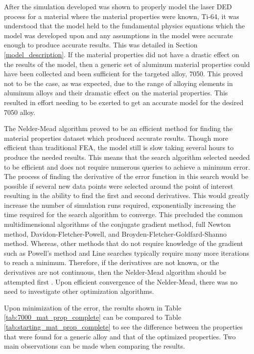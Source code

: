 \label{discussion}

After the simulation developed was shown to properly model the laser \ac{DED} process for a material where the material properties were known, Ti-64, it was understood that the model held to the fundamental physics equations which the model was developed upon and any assumptions in the model were accurate enough to produce accurate results.  This was detailed in Section \ref{model_description}. 
If the material properties did not have a drastic effect on the results of the model, then a generic set of aluminum material properties could have been collected and been sufficient for the targeted alloy, 7050.  This proved not to be the case, as was expected, due to the range of alloying elements in aluminum alloys and their dramatic effect on the material properties.  This resulted in effort needing to be exerted to get an accurate model for the desired 7050 alloy.

The Nelder-Mead algorithm proved to be an efficient method for finding the material properties dataset which produced accurate results.  Though more efficient than traditional \ac{FEA}, the model still is slow taking several hours to produce the needed results.  This means that the search algorithm selected needed to be efficient and does not require numerous queries to achieve a minimum error.  The process of finding the derivative of the error function in this search would be possible if several new data points were selected around the point of interest resulting in the ability to find the first and second derivatives.  This would greatly increase the number of simulation runs required, exponentially increasing the time required for the search algorithm to converge.  This precluded the common multidimensional algorithms of the conjugate gradient method, full Newton method, Davidon-Fletcher-Powell, and Broyden-Fletcher-Goldfard-Shanno method.  Whereas, other methods that do not require knowledge of the gradient such as Powell's method and Line searches typically require many more iterations to reach a minimum.  Therefore, if the derivatives are not known, or the derivatives are not continuous, then the Nelder-Mead algorithm should be attempted first	\cite{extremeoptimization}.  Upon efficient convergence of the Nelder-Mead, there was no need to investigate other optimization algorithms.

Upon minimization of the error, the results shown in Table \ref{tab:7000_mat_prop_complete} can be compared to Table \ref{tab:starting_mat_prop_complete} to see the difference between the properties that were found for a generic 
alloy and that of the optimized properties.  Two main observations can be made when comparing the results.



